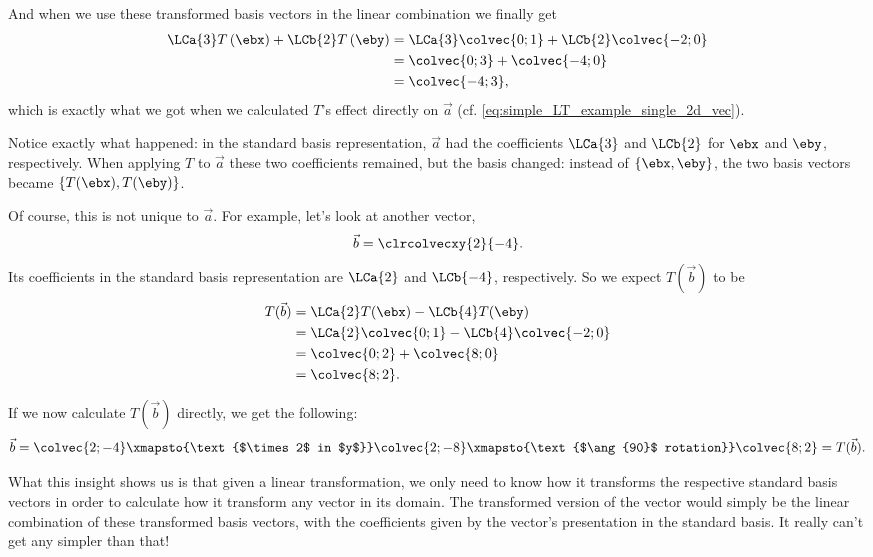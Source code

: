 And when we use these transformed basis vectors in the linear combination we finally get
\begin{equation}
	\begin{aligned}
		\LCa{3}T\left(\ebx\right) + \LCb{2}T\left(\eby\right) & = \LCa{3}\colvec{0;1} +\LCb{2}\colvec{-2;0} \\
		                                                      & = \colvec{0;3} + \colvec{-4;0}              \\
		                                                      & = \colvec{-4;3},
	\end{aligned}
	\label{eq:}
\end{equation}
which is exactly what we got when we calculated $T$'s effect directly on $\vec{a}$ (cf. \autoref{eq:simple_LT_example_single_2d_vec}).

Notice exactly what happened: in the standard basis representation, $\vec{a}$ had the coefficients $\LCa{3}$ and $\LCb{2}$ for $\ebx$ and $\eby$, respectively. When applying $T$ to $\vec{a}$ these two coefficients remained, but the basis changed: instead of $\left\{\ebx,\eby\right\}$, the two basis vectors became $\left\{T(\ebx),T(\eby)\right\}$.

Of course, this is not unique to $\vec{a}$. For example, let's look at another vector, $$\vec{b}=\clrcolvecxy{2}{-4}.$$ Its coefficients in the standard basis representation are $\LCa{2}$ and $\LCb{-4}$, respectively. So we expect $T(\vec{b})$ to be
\begin{equation}
	\begin{aligned}
		T(\vec{b}) & = \LCa{2}T(\ebx) - \LCb{4}T(\eby)            \\
		           & = \LCa{2}\colvec{0;1} - \LCb{4}\colvec{-2;0} \\
		           & = \colvec{0;2} + \colvec{8;0}                \\
		           & = \colvec{8;2}.
	\end{aligned}
	\label{eq:second_simple_LT_example_single_2d_vec}
\end{equation}

If we now calculate $T(\vec{b})$ directly, we get the following:
\begin{equation}
	\vec{b} = \colvec{2;-4} \xmapsto{\text{$\times 2$ in $y$}} \colvec{2;-8} \xmapsto{\text{$\ang{90}$ rotation}} \colvec{8;2} = T(\vec{b}).
	\label{eq:simple_LT_example_single_2d_vec}
\end{equation}

What this insight shows us is that given a linear transformation, we only need to know how it transforms the respective standard basis vectors in order to calculate how it transform any vector in its domain. The transformed version of the vector would simply be the linear combination of these transformed basis vectors, with the coefficients given by the vector's presentation in the standard basis. It really can't get any simpler than that!

